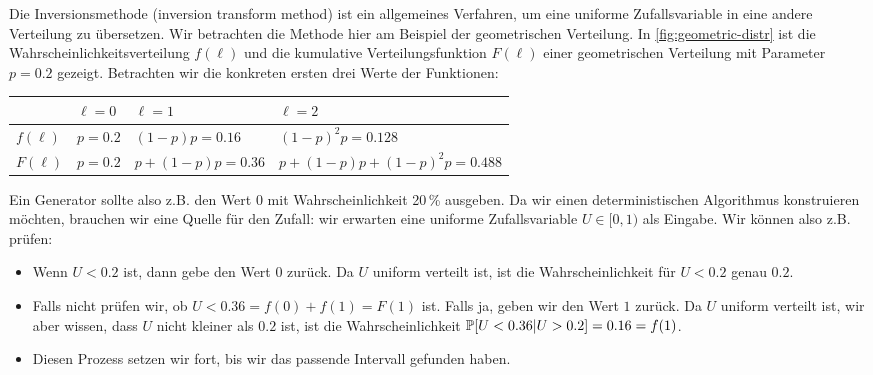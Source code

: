 Die  Inversionsmethode (inversion transform method) ist ein allgemeines Verfahren, um eine uniforme Zufallsvariable in eine andere Verteilung zu übersetzen.
Wir betrachten die Methode hier am Beispiel der geometrischen Verteilung.
In \cref{fig:geometric-distr} ist die Wahrscheinlichkeitsverteilung $f(\ell)$ und die kumulative Verteilungsfunktion $F(\ell)$ einer geometrischen Verteilung mit Parameter $p = 0.2$ gezeigt.
%
Betrachten wir die konkreten ersten drei Werte der Funktionen:

\begin{center}
    \begin{tabular}{l|p{}p{}p{}}
                  & $\ell = 0$ & $\ell = 1$              & $\ell = 2$                              \\\hline\hline
        $f(\ell)$ & $p =0.2$   & $(1 {-} p)p = 0.16$     & $(1 {-} p)^2p = 0.128$                  \\
        $F(\ell)$ & $p =0.2$   & $p{+}(1 {-} p)p = 0.36$ & $p{+}(1 {-} p)p{+}(1 {-} p)^2p = 0.488$
    \end{tabular}
\end{center}
\vspace{1em}

Ein Generator sollte also z.B. den Wert $0$ mit Wahrscheinlichkeit 20\,\% ausgeben.
Da wir einen deterministischen Algorithmus konstruieren möchten, brauchen wir eine Quelle für den Zufall:
wir erwarten eine uniforme Zufallsvariable $U \in [0, 1)$ als Eingabe.
Wir können also z.B. prüfen:
\begin{itemize}
    \item Wenn $U < 0.2$ ist, dann gebe den Wert $0$ zurück.
          Da $U$ uniform verteilt ist, ist die Wahrscheinlichkeit für $U < 0.2$ genau $0.2$.

    \item Falls nicht prüfen wir, ob $U < 0.36 = f(0) + f(1) = F(1)$ ist. Falls ja, geben wir den Wert $1$ zurück.
          Da $U$ uniform verteilt ist, wir aber wissen, dass $U$ nicht kleiner als $0.2$ ist, ist die Wahrscheinlichkeit $\mathbb{P}\!\left[U < 0.36 | U > 0.2\right] = 0.16 = f(1)$.

    \item Diesen Prozess setzen wir fort, bis wir das passende Intervall gefunden haben.
\end{itemize}

